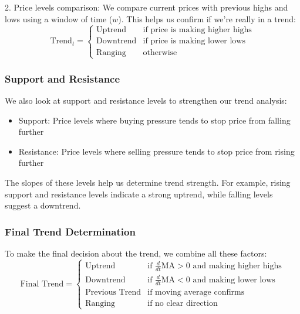 \documentclass[12pt]{article}
\begin{document}
2. Price levels comparison:
We compare current prices with previous highs and lows using a window of time ($w$). This helps us confirm if we're really in a trend:
\begin{equation*}
\text{Trend}_t = \begin{cases}
    \text{Uptrend} & \text{if price is making higher highs} \\
    \text{Downtrend} & \text{if price is making lower lows} \\
    \text{Ranging} & \text{otherwise}
\end{cases}
\end{equation*}

\subsubsection{Support and Resistance}
We also look at support and resistance levels to strengthen our trend analysis:

\begin{itemize}
    \item Support: Price levels where buying pressure tends to stop price from falling further
    \item Resistance: Price levels where selling pressure tends to stop price from rising further
\end{itemize}

The slopes of these levels help us determine trend strength. For example, rising support and resistance levels indicate a strong uptrend, while falling levels suggest a downtrend.

\subsubsection{Final Trend Determination}
To make the final decision about the trend, we combine all these factors:
\begin{equation*}
\text{Final Trend} = \begin{cases}
    \text{Uptrend} & \text{if } \frac{d}{dt}\text{MA} > 0 \text{ and making higher highs} \\
    \text{Downtrend} & \text{if } \frac{d}{dt}\text{MA} < 0 \text{ and making lower lows} \\
    \text{Previous Trend} & \text{if moving average confirms} \\
    \text{Ranging} & \text{if no clear direction}
\end{cases}
\end{equation*}
\end{document}
